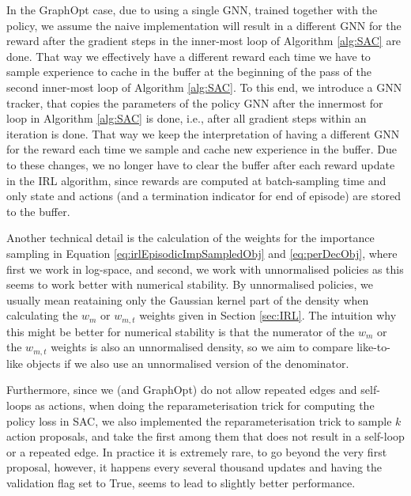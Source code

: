 \documentclass{report}
\numberwithin{equation}{section}
\numberwithin{figure}{section}
\numberwithin{table}{section}
\numberwithin{algorithm}{section}
\begin{document}
In the GraphOpt case, due to using a single GNN, 
trained together with the policy, we assume the naive implementation 
will result in a different GNN for the reward 
after the gradient steps in the inner-most loop of Algorithm 
\ref{alg:SAC} are done. That way we effectively have a different 
reward each time we have to sample experience to cache in the 
buffer at the beginning of the pass of the second inner-most 
loop of Algorithm \ref{alg:SAC}. To this end,
we introduce a GNN tracker, 
that copies the parameters of the policy GNN after the innermost 
for loop in Algorithm \ref{alg:SAC} is done, i.e., after all 
gradient steps within an iteration is done. That way we keep the 
interpretation of having a different GNN for the reward each 
time we sample and cache new experience in the buffer. Due to 
these changes, we no longer have to clear the buffer after each 
reward update in the IRL algorithm, since rewards are computed 
at batch-sampling time and only state and actions (and a termination 
indicator for end of episode) are stored 
to the buffer.

Another technical detail is the calculation of the weights 
for the importance sampling in Equation \ref{eq:irlEpisodicImpSampledObj} 
and \ref{eq:perDecObj}, where first we work in log-space, and 
second, we work with unnormalised policies as this seems to work 
better with numerical stability. By unnormalised policies, we 
usually mean reataining only the Gaussian kernel part of the 
density when calculating the $w_m$ or $w_{m,t}$ weights given 
in Section \ref{sec:IRL}. The intuition why this might be better 
for numerical stability is that the numerator of the $w_m$ 
or the $w_{m,t}$ weights is also an unnormalised density, so 
we aim to compare like-to-like objects if we also use an 
unnormalised version of the denominator.

Furthermore, since we (and GraphOpt) do not allow repeated edges 
and self-loops as actions, 
when doing the reparameterisation trick for computing 
the policy loss in SAC, we also implemented the reparameterisation 
trick to sample $k$ action proposals, and take the first among 
them that does not result in a self-loop or a repeated edge. 
In practice it is extremely rare, to go beyond the very first 
proposal, however, it happens every several thousand updates 
and having the validation flag set to True, seems to lead to 
slightly better performance.
\end{document}

